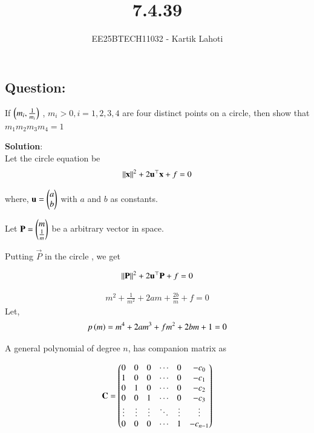 \documentclass[journal]{IEEEtran}
\numberwithin{equation}{enumi}
\numberwithin{figure}{enumi}
\begin{document}

\vspace{3cm}

\title{7.4.39}
\author{EE25BTECH11032 - Kartik Lahoti}
\maketitle

\subsection*{Question: } 

If $\left(m_i , \frac{1}{m_i}\right)$ , $m_i > 0 , i = 1, 2,3,4$ are four distinct points on a circle, then show that $m_1m_2m_3m_4 = 1 $

\textbf{Solution}:\\


Let the circle equation be 
\begin{align}
    \left\lVert\mathbf{x}\right\rVert^2 + 2\mathbf{u}^{\top}\mathbf{x} + f = 0 
\end{align}

where, $\mathbf{u} = \begin{pmatrix}a \\ b\end{pmatrix}$ with $a$ and $b$ as constants.

Let $\mathbf{P} = \begin{pmatrix}m \\ \frac{1}{m}\end{pmatrix}$ be a arbitrary vector in space.

Putting $\vec{P}$ in the circle , we get 


\begin{align}
    \left\lVert\mathbf{P}\right\rVert^2 + 2\mathbf{u}^{\top}\mathbf{P} + f = 0 
\end{align}

\begin{align}
    m^2 + \frac{1}{m^2} + 2am + \frac{2b}{m} + f = 0
\end{align}
Let, 
\begin{align}
    p\left(m\right) = m^4 + 2am^3 + fm^2 + 2bm + 1 = 0 \label{eq_1}
\end{align}

A general polynomial of degree $n$, has companion matrix as

\begin{align}
   \mathbf{C} = \begin{pmatrix}0 & 0 & 0 & \cdots & 0 & -c_{0} \\
1 & 0 & 0 & \cdots & 0 & -c_{1} \\
0 & 1 & 0 & \cdots & 0 & -c_{2} \\
0 & 0 & 1 & \cdots & 0 & -c_{3} \\
\vdots & \vdots & \vdots & \ddots & \vdots & \vdots \\
0 & 0 & 0 & \cdots & 1 & -c_{n-1}\end{pmatrix}
\end{align}
\end{document}

